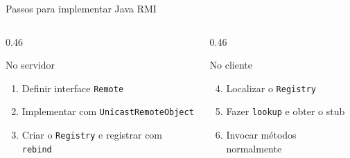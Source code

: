 \documentclass[aspectratio=169]{beamer}
\newcommand{\code}[1]{\texttt{#1}}
\begin{document}
\begin{frame}{Passos para implementar Java RMI}
    \begin{columns}[T]
        \begin{column}{0.46\textwidth}
            \begin{block}{No servidor}
                \begin{enumerate}
                    \item Definir interface \code{Remote}
                    \item Implementar com \code{UnicastRemoteObject}
                    \item Criar o \code{Registry} e registrar com \code{rebind}
                \end{enumerate}
            \end{block}
        \end{column}
        \begin{column}{0.46\textwidth}
            \begin{block}{No cliente}
                \begin{enumerate}
                    \setcounter{enumi}{3}
                    \item Localizar o \code{Registry}
                    \item Fazer \code{lookup} e obter o stub
                    \item Invocar métodos normalmente
                \end{enumerate}
            \end{block}
        \end{column}
    \end{columns}
\end{frame}
\end{document}
